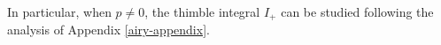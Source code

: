 \documentclass{article}
\theoremstyle{definition}
\newcommand{\laplace}{\mathcal{L}}
\newtheorem{lemma}[definition]{Lemma}
\begin{document}
In particular, when $p\neq 0$, the thimble integral $I_+$ can be studied following the analysis of Appendix \ref{airy-appendix}. 





\end{document}
